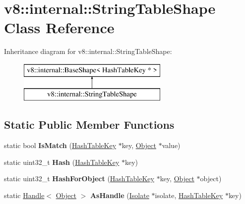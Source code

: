 \hypertarget{classv8_1_1internal_1_1_string_table_shape}{}\section{v8\+:\+:internal\+:\+:String\+Table\+Shape Class Reference}
\label{classv8_1_1internal_1_1_string_table_shape}
Inheritance diagram for v8\+:\+:internal\+:\+:String\+Table\+Shape\+:\begin{figure}[H]
\begin{center}
\leavevmode
\includegraphics[height=2.000000cm]{classv8_1_1internal_1_1_string_table_shape}
\end{center}
\end{figure}
\subsection*{Static Public Member Functions}
\begin{DoxyCompactItemize}
\item 
\hypertarget{classv8_1_1internal_1_1_string_table_shape_a5e9f159278f5a174d774735b0a8edd63}{}static bool {\bfseries Is\+Match} (\hyperlink{classv8_1_1internal_1_1_hash_table_key}{Hash\+Table\+Key} $\ast$key, \hyperlink{classv8_1_1internal_1_1_object}{Object} $\ast$value)\label{classv8_1_1internal_1_1_string_table_shape_a5e9f159278f5a174d774735b0a8edd63}

\item 
\hypertarget{classv8_1_1internal_1_1_string_table_shape_aae58d635ae12319ded412968d74d363f}{}static uint32\+\_\+t {\bfseries Hash} (\hyperlink{classv8_1_1internal_1_1_hash_table_key}{Hash\+Table\+Key} $\ast$key)\label{classv8_1_1internal_1_1_string_table_shape_aae58d635ae12319ded412968d74d363f}

\item 
\hypertarget{classv8_1_1internal_1_1_string_table_shape_ac3e9f944155235114af36606e72a3550}{}static uint32\+\_\+t {\bfseries Hash\+For\+Object} (\hyperlink{classv8_1_1internal_1_1_hash_table_key}{Hash\+Table\+Key} $\ast$key, \hyperlink{classv8_1_1internal_1_1_object}{Object} $\ast$object)\label{classv8_1_1internal_1_1_string_table_shape_ac3e9f944155235114af36606e72a3550}

\item 
\hypertarget{classv8_1_1internal_1_1_string_table_shape_a448840b51e46ca6f243a58848bfaf711}{}static \hyperlink{classv8_1_1internal_1_1_handle}{Handle}$<$ \hyperlink{classv8_1_1internal_1_1_object}{Object} $>$ {\bfseries As\+Handle} (\hyperlink{classv8_1_1internal_1_1_isolate}{Isolate} $\ast$isolate, \hyperlink{classv8_1_1internal_1_1_hash_table_key}{Hash\+Table\+Key} $\ast$key)\label{classv8_1_1internal_1_1_string_table_shape_a448840b51e46ca6f243a58848bfaf711}

\end{DoxyCompactItemize}
